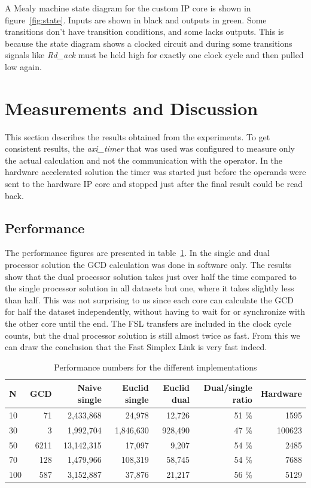 \documentclass[11pt]{article}
\begin{document}
A Mealy machine state diagram for the custom IP core is shown in figure~\ref{fig:state}. Inputs are shown in black and outputs in green. Some transitions don't have transition conditions, and some lacks outputs. This is because the state diagram shows a clocked circuit and during some transitions signals like \emph{Rd\_ack} must be held high for exactly one clock cycle and then pulled low again.

\section{Measurements and Discussion\label{sec:measurements}}
This section describes the results obtained from the experiments. To get consistent results, the \emph{axi\_timer} that was used was configured to measure only the actual calculation and not the communication with the operator. In the hardware accelerated solution the timer was started just before the operands were sent to the hardware IP core and stopped just after the final result could be read back.

\subsection{Performance}
The performance figures are presented in table~\ref{tab:Clockcycles}. In the single and dual processor solution the GCD calculation was done in software only. The results show that the dual processor solution takes just over half the time compared to the single processor solution in all datasets but one, where it takes slightly less than half. This was not surprising to us since each core can calculate the GCD for half the dataset independently, without having to wait for or synchronize with the other core until the end. The FSL transfers are included in the clock cycle counts, but the dual processor solution is still almost twice as fast. From this we can draw the conclusion that the Fast Simplex Link is very fast indeed.

\begin{table}
   \centering
   \begin{tabular}{l|rrrrrr}
      \toprule
	N & GCD & Naive single & Euclid single	& Euclid dual & Dual/single ratio & Hardware \\
      \midrule
      10	& 71 & 2,433,868 & 24,978			& 12,726	& 51 \%		&1595\\
      30	& 3 & 1,992,704 & 1,846,630		&  928,490	& 47 \%	&100623\\
      50	& 6211 & 13,142,315 & 17,097			& 9,207	& 54 \%		&2485\\
      70	& 128 & 1,479,966 & 108,319		& 58,745	& 54 \%		&7688\\
     100	& 587 & 3,152,887 & 37,876			&  21,217 & 56 \%		&5129\\
      \bottomrule
   \end{tabular}
   \caption{Performance numbers for the different implementations}
   \label{tab:Clockcycles}
\end{table}
\end{document}
